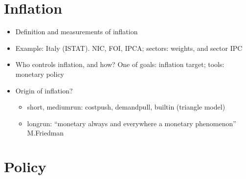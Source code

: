 \documentclass[letterpaper,10pt,english]{jupyterBook}
\begin{document}
\chapter{Inflation}
\label{\detokenize{ch/inflation:inflation}}\label{\detokenize{ch/inflation:fin-edu-inflation}}\label{\detokenize{ch/inflation::doc}}\begin{itemize}
\item {} 
\sphinxAtStartPar
Definition and measurements of inflation

\item {} 
\sphinxAtStartPar
Example: Italy (ISTAT). NIC, FOI, IPCA; sectors: weights, and sector IPC

\item {} 
\sphinxAtStartPar
Who controls inflation, and how? One of {\hyperref[\detokenize{ch/actors:fin-edu-actors-banks-cb}]{}} goals: inflation target; tools: monetary policy

\item {} 
\sphinxAtStartPar
Origin of inflation?
\begin{itemize}
\item {} 
\sphinxAtStartPar
short\sphinxhyphen{}, medium\sphinxhyphen{}run: cost\sphinxhyphen{}push, demand\sphinxhyphen{}pull, built\sphinxhyphen{}in (triangle model)

\item {} 
\sphinxAtStartPar
long\sphinxhyphen{}run: “monetary always and everywhere a monetary phenomenon” M.Friedman

\end{itemize}

\end{itemize}

\sphinxstepscope


\chapter{Policy}
\label{\detokenize{ch/policy:policy}}\label{\detokenize{ch/policy:fin-edu-policy}}\label{\detokenize{ch/policy::doc}}
\end{document}
